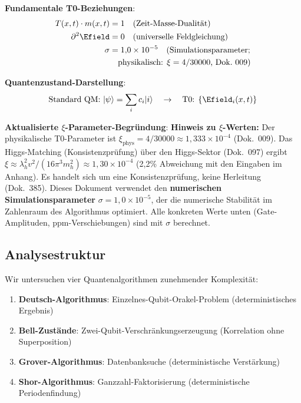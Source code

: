 	\begin{tcolorbox}[colback=blue!5!white,colframe=blue!75!black,title=Kern-T0-Prinzipien mit aktualisiertem $\xi$-Parameter]
		\textbf{Fundamentale T0-Beziehungen}:
\begin{align}
	T(x,t) \cdot m(x,t) &= 1 \quad \text{(Zeit-Masse-Dualität)} \\
	\partial^2 \Efield &= 0 \quad \text{(universelle Feldgleichung)} \\
	\sigma &= 1{,}0 \times 10^{-5} \quad 
	\text{(Simulationsparameter;}\\
	& \quad \text{physikalisch: $\xi = 4/30000$, Dok.~009)}
\end{align}
		
		\textbf{Quantenzustand-Darstellung}:
		\begin{equation}
			\text{Standard QM: } |\psi\rangle = \sum_i c_i |i\rangle \quad \rightarrow \quad \text{T0: } \{\Efield_i(x,t)\}
		\end{equation}
		
		\textbf{Aktualisierte $\xi$-Parameter-Begründung}:
		\textbf{Hinweis zu $\xi$-Werten:} Der physikalische T0-Parameter ist $\xi_{\text{phys}} = 4/30000 \approx 1{,}333 \times 10^{-4}$ (Dok.~009). Das Higgs-Matching (Konsistenzprüfung) über den Higgs-Sektor (Dok.~097) ergibt $\xi \approx \lambda_h^2 v^2/(16\pi^3 m_h^2) \approx 1{,}30 \times 10^{-4}$ (2{,}2\% Abweichung mit den Eingaben im Anhang). Es handelt sich um eine Konsistenzprüfung, keine Herleitung (Dok.~385). Dieses Dokument verwendet den \textbf{numerischen Simulationsparameter} $\sigma = 1{,}0 \times 10^{-5}$, der die numerische Stabilität im Zahlenraum des Algorithmus optimiert. Alle konkreten Werte unten (Gate-Amplituden, ppm-Verschiebungen) sind mit $\sigma$ berechnet.
	\end{tcolorbox}
	
	\subsection{Analysestruktur}
	
	Wir untersuchen vier Quantenalgorithmen zunehmender Komplexität:
	
	\begin{enumerate}
		\item \textbf{Deutsch-Algorithmus}: Einzelnes-Qubit-Orakel-Problem (deterministisches Ergebnis)
		\item \textbf{Bell-Zustände}: Zwei-Qubit-Verschränkungserzeugung (Korrelation ohne Superposition)
		\item \textbf{Grover-Algorithmus}: Datenbanksuche (deterministische Verstärkung)
		\item \textbf{Shor-Algorithmus}: Ganzzahl-Faktorisierung (deterministische Periodenfindung)
	\end{enumerate}
	
